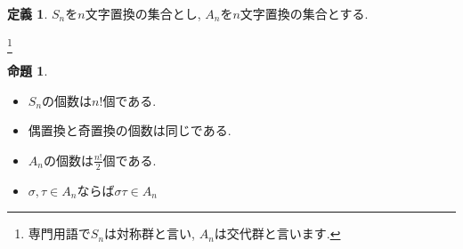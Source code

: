 \documentclass[dvipdfmx,a4paper,11pt]{article}
\theoremstyle{definition}
\newtheorem{prop}[thm]{命題}
\newtheorem{dfn}[thm]{定義}
\begin{document}
 
  \begin{tcolorbox}[
    colback = white,
    colframe = green!35!black,
    fonttitle = \bfseries,
    breakable = true]
    \begin{dfn}
$S_n$を$n$文字置換の集合とし, $A_n$を$n$文字置換の集合とする.
  \end{dfn}
 \end{tcolorbox}
 \footnote{専門用語で$S_n$は対称群と言い, $A_n$は交代群と言います. }

  \begin{tcolorbox}[
    colback = white,
    colframe = green!35!black,
    fonttitle = \bfseries,
    breakable = true]
    \begin{prop}\text{}
    \begin{itemize}
\item $S_n$の個数は$n!$個である.
\item 偶置換と奇置換の個数は同じである.
\item $A_n$の個数は$\frac{n!}{2}$個である.
\item $\sigma, \tau \in A_n$ならば$\sigma \tau \in A_n$
    \end{itemize}
  \end{prop}
 \end{tcolorbox}

 
\end{document}

